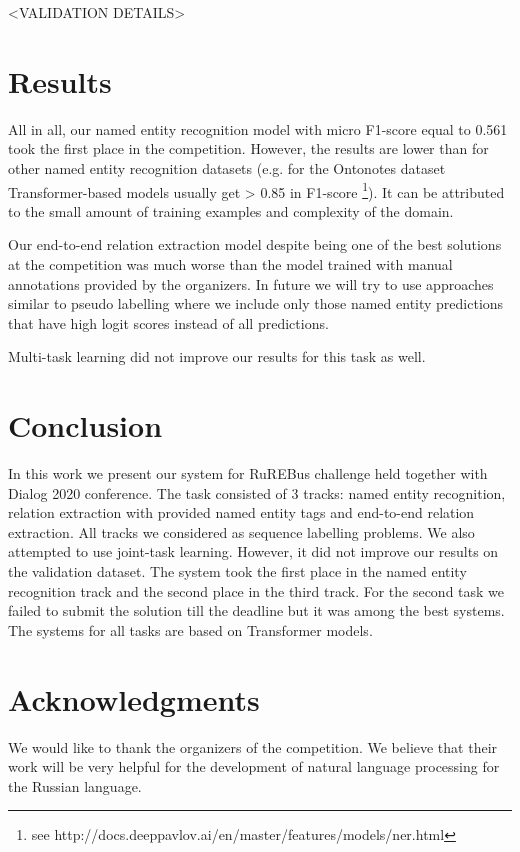 \documentclass{dialogue}
\begin{document}
<VALIDATION DETAILS>

\section{Results}
All in all, our named entity recognition model with micro F1-score equal to 0.561 took the first place in the competition. However, the results are lower than for other named entity recognition datasets (e.g. for the Ontonotes dataset Transformer-based models usually get > 0.85 in F1-score \footnote{see http://docs.deeppavlov.ai/en/master/features/models/ner.html}). It can be attributed to the small amount of training examples and complexity of the domain.

Our end-to-end relation extraction model despite being one of the best solutions at the competition was much worse than the model trained with manual annotations provided by the organizers. In future we will try to use approaches similar to pseudo labelling where we include only those named entity predictions that have high logit scores instead of all predictions.

Multi-task learning did not improve our results for this task as well. 
\section{Conclusion}
In this work we present our system for RuREBus challenge held together with Dialog 2020 conference. The task consisted of 3 tracks: named entity recognition, relation extraction with provided named entity tags and end-to-end relation extraction. All tracks we considered as sequence labelling problems. We also attempted to use joint-task learning. However, it did not improve our results on the validation dataset. The system took the first place in the named entity recognition track and the second place in the third track. For the second task we failed to submit the solution till the deadline but it was among the best systems. The systems for all tasks are based on Transformer models.

\section{Acknowledgments}
We would like to thank the organizers of the competition. We believe that their work will be very helpful for the development of natural language processing for the Russian language.

\end{document}
